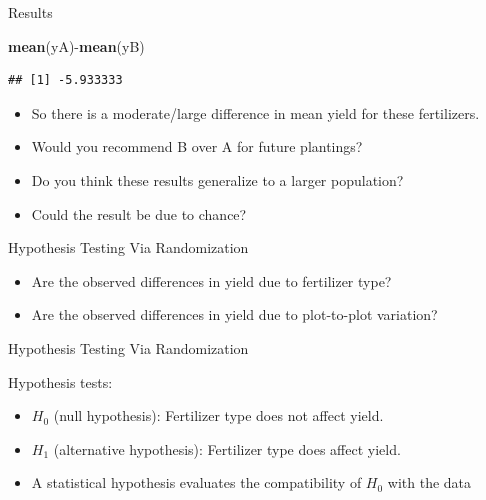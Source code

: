 \documentclass[10pt,ignorenonframetext,]{beamer}
\newenvironment{Shaded}{\begin{snugshade}}{\end{snugshade}}
\newcommand{\KeywordTok}[1]{\textcolor[rgb]{0.13,0.29,0.53}{\textbf{{#1}}}}
\newcommand{\NormalTok}[1]{{#1}}
\providecommand{\tightlist}{%
\setlength{\itemsep}{0pt}\setlength{\parskip}{0pt}}
\begin{document}
\begin{frame}[fragile]{Results}

\begin{Shaded}
\begin{Highlighting}[]
\KeywordTok{mean}\NormalTok{(yA)-}\KeywordTok{mean}\NormalTok{(yB)}
\end{Highlighting}
\end{Shaded}

\begin{verbatim}
## [1] -5.933333
\end{verbatim}

\begin{itemize}
\tightlist
\item
  So there is a moderate/large difference in mean yield for these
  fertilizers.
\item
  Would you recommend B over A for future plantings?
\item
  Do you think these results generalize to a larger population?
\item
  Could the result be due to chance?
\end{itemize}

\end{frame}

\begin{frame}{Hypothesis Testing Via Randomization}

\begin{itemize}
\tightlist
\item
  Are the observed differences in yield due to fertilizer type?
\item
  Are the observed differences in yield due to plot-to-plot variation?
\end{itemize}

\end{frame}

\begin{frame}{Hypothesis Testing Via Randomization}

Hypothesis tests:

\begin{itemize}
\item
  \(H_0\) (null hypothesis): Fertilizer type does not affect yield.
\item
  \(H_1\) (alternative hypothesis): Fertilizer type does affect yield.
\item
  A statistical hypothesis evaluates the compatibility of \(H_0\) with
  the data
\end{itemize}

\end{frame}
\end{document}
